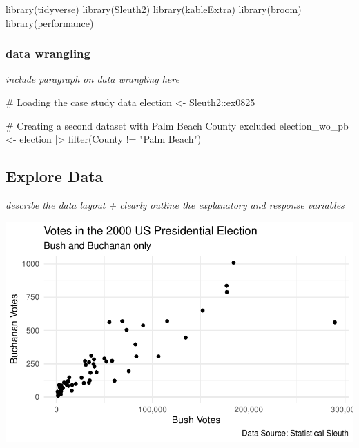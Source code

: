 \documentclass[
  letterpaper,
  DIV=11,
  numbers=noendperiod]{scrartcl}
\newenvironment{Shaded}{\begin{snugshade}}{\end{snugshade}}
\newcommand{\CommentTok}[1]{\textcolor[rgb]{0.37,0.37,0.37}{#1}}
\newcommand{\FunctionTok}[1]{\textcolor[rgb]{0.28,0.35,0.67}{#1}}
\newcommand{\NormalTok}[1]{\textcolor[rgb]{0.00,0.23,0.31}{#1}}
\newcommand{\OtherTok}[1]{\textcolor[rgb]{0.00,0.23,0.31}{#1}}
\newcommand{\SpecialCharTok}[1]{\textcolor[rgb]{0.37,0.37,0.37}{#1}}
\newcommand{\StringTok}[1]{\textcolor[rgb]{0.13,0.47,0.30}{#1}}
\begin{document}
\begin{Shaded}
\begin{Highlighting}[]
\FunctionTok{library}\NormalTok{(tidyverse)}
\FunctionTok{library}\NormalTok{(Sleuth2) }
\FunctionTok{library}\NormalTok{(kableExtra)  }
\FunctionTok{library}\NormalTok{(broom)}
\FunctionTok{library}\NormalTok{(performance)}
\end{Highlighting}
\end{Shaded}

\hypertarget{data-wrangling}{%
\subsubsection{data wrangling}\label{data-wrangling}}

\emph{include paragraph on data wrangling here}

\begin{Shaded}
\begin{Highlighting}[]
\CommentTok{\# Loading the case study data}
\NormalTok{election }\OtherTok{\textless{}{-}}\NormalTok{ Sleuth2}\SpecialCharTok{::}\NormalTok{ex0825}

\CommentTok{\# Creating a second dataset with Palm Beach County excluded}
\NormalTok{election\_wo\_pb }\OtherTok{\textless{}{-}}\NormalTok{ election }\SpecialCharTok{|\textgreater{}} \FunctionTok{filter}\NormalTok{(County }\SpecialCharTok{!=} \StringTok{"Palm Beach"}\NormalTok{)}
\end{Highlighting}
\end{Shaded}

\hypertarget{explore-data}{%
\subsection{Explore Data}\label{explore-data}}

\emph{describe the data layout + clearly outline the explanatory and
response variables}

\includegraphics{sds-291_s-24_case-study-template_files/figure-pdf/unnamed-chunk-3-1.pdf}
\end{document}
